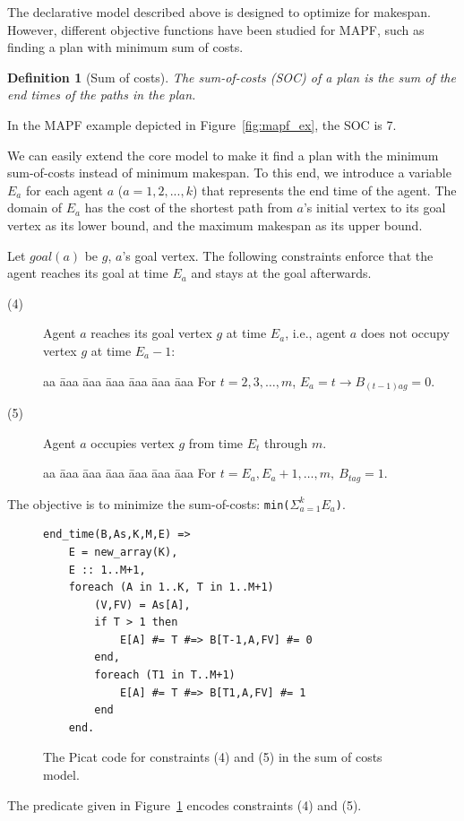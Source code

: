 \documentclass[conference]{IEEEtran}
\newtheorem{definition}{Definition}
\begin{document}
The declarative model described above is designed to optimize for makespan. However, different objective functions have been studied for MAPF, such as finding a plan with minimum sum of costs.

\begin{definition}[Sum of costs]
The \textit{sum-of-costs} (SOC) of a plan is the sum of the end times of the paths in the plan. 
\end{definition}
In the MAPF example depicted in Figure~\ref{fig:mapf_ex}, the SOC is 7. 


We can easily extend the core model to make it find a plan with the minimum sum-of-costs instead of minimum makespan. To this end, we introduce a variable $E_a$ for each agent $a$ ($a = 1,2,..., k$) that represents the end time of the agent. The domain of $E_a$ has the cost of the shortest path from $a$'s initial vertex to its goal vertex as its lower bound, and the maximum makespan as its upper bound.

Let $goal(a)$ be $g$, $a$'s goal vertex. The following constraints enforce that the agent reaches its goal at time $E_a$ and stays at the goal afterwards.
\begin{description}
\item[(4)] Agent $a$ reaches its goal vertex $g$ at time $E_a$, i.e., agent $a$ does not occupy vertex $g$ at time $E_a-1$:
\begin{tabbing}
aa \= aaa \= aaa \= aaa \= aaa \= aaa \= aaa \kill
For $t = 2, 3, \ldots, m$, $E_a = t \rightarrow B_{(t-1) a g} = 0$.
\end{tabbing}

\item[(5)] Agent $a$ occupies vertex $g$ from time $E_t$ through  $m$.
\begin{tabbing}
aa \= aaa \= aaa \= aaa \= aaa \= aaa \= aaa \kill
\> For $t = E_a, E_a+1, \ldots, m,\  B_{t a g} = 1$.
\end{tabbing}
\end{description}
The objective is to minimize the sum-of-costs: \texttt{min($\Sigma_{a=1}^kE_a$)}.
\begin{figure}
\begin{small}
\begin{verbatim}
end_time(B,As,K,M,E) =>
    E = new_array(K),
    E :: 1..M+1,
    foreach (A in 1..K, T in 1..M+1)
        (V,FV) = As[A],
        if T > 1 then
            E[A] #= T #=> B[T-1,A,FV] #= 0
        end,
        foreach (T1 in T..M+1)
            E[A] #= T #=> B[T1,A,FV] #= 1
        end
    end.
\end{verbatim}
\end{small}
\caption{The Picat code for constraints (4) and (5) in the sum of costs model.}
\label{fig:soc-encoding}
\end{figure}
The predicate given in Figure~\ref{fig:soc-encoding} encodes constraints (4) and (5).
\end{document}
